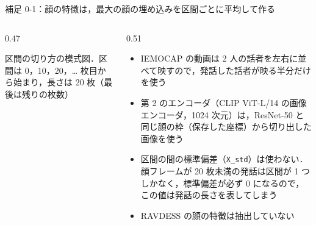 \begin{frame}{補足 0-1：顔の特徴は，最大の顔の埋め込みを区間ごとに平均して作る}
\begin{columns}[T,onlytextwidth]
\begin{column}{0.47\textwidth}
\begin{tikzpicture}[x=0.112cm, y=1cm, font=\scriptsize]
      \end{tikzpicture}\par
      {\raggedright\tiny 区間の切り方の模式図．区間は 0，10，20，… 枚目から始まり，長さは 20 枚（最後は残りの枚数）\par}
    \end{column}
    \begin{column}{0.51\textwidth}
      \begin{itemize}\scriptsize\setlength{\itemsep}{3pt}
        \item IEMOCAP の動画は 2 人の話者を左右に並べて映すので，発話した話者が映る半分だけを使う
        \item 第 2 のエンコーダ（CLIP ViT-L/14 の画像エンコーダ，1024 次元）は，ResNet-50 と同じ顔の枠（保存した座標）から切り出した画像を使う
        \item 区間の間の標準偏差（\texttt{X\_std}）は使わない．顔フレームが 20 枚未満の発話は区間が 1 つしかなく，標準偏差が必ず 0 になるので，この値は発話の長さを表してしまう
        \item RAVDESS の顔の特徴は抽出していない
      \end{itemize}
    \end{column}
  \end{columns}
\end{frame}

